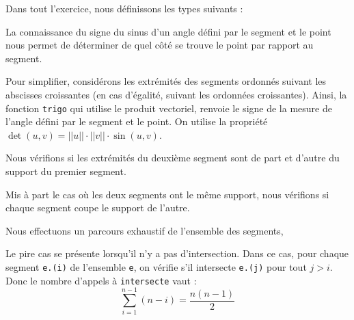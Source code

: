 Dans tout l'exercice, nous définissons les types suivants :



\Q
La connaissance du signe du sinus d'un angle défini par le segment et le point nous permet de déterminer de quel côté se trouve le point par rapport au segment.
\medskip


Pour simplifier, considérons les extrémités des segments ordonnés suivant les abscisses croissantes (en cas d'égalité, suivant les ordonnées croissantes). Ainsi, la fonction \texttt{trigo} qui utilise le produit vectoriel, renvoie le signe de la mesure de l'angle défini par le segment et le point. On utilise la propriété $\det(u,v) = ||u||\cdot||v||\cdot\sin(u,v)$.



\Q
Nous vérifions si les extrémités du deuxième segment sont de part et d'autre du support du premier segment.



\Q
Mis à part le cas où les deux segments ont le même support, nous vérifions si chaque segment coupe le support de l'autre.



\Q
Nous effectuons un parcours exhaustif de l'ensemble des segments,



Le pire cas se présente lorsqu'il n'y a pas d'intersection. Dans ce cas, pour chaque segment \texttt{e.(i)} de l'ensemble \texttt{e}, on vérifie s'il intersecte \texttt{e.(j)} pour tout $j>i$. Donc le nombre d'appels à \texttt{intersecte} vaut :
\[
    \sum_{i=1}^{n-1}(n-i)=\frac{n(n-1)}{2}
\]

